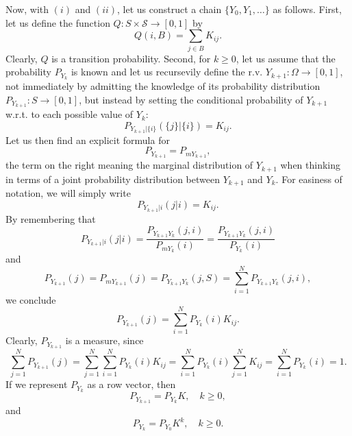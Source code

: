 Now, with $(i)$ and $(ii)$, let us construct a chain $\{Y_0,Y_1,\ldots\}$ as follows.
First, let us define the function $Q:S\times\mathcal{S}\rightarrow [0,1]$ by
\begin{equation*}
Q(i,B) = \sum_{j\in B}{K}_{ij}.
\end{equation*}
Clearly, $Q$ is a transition probability.
Second, for $k\geqslant 0$, let us assume that the probability $P_{Y_{k}}$ is known and
let us recursevily define the r.v. $Y_{k+1}:\Omega\rightarrow [0,1]$,
not immediately
by admitting the knowledge of its probability distribution $P_{Y_{k+1}}:S\rightarrow [0,1]$,
but instead
by setting the conditional probability of $Y_{k+1}$ w.r.t. to each possible value of $Y_k$:
\begin{equation*}
P_{Y_{k+1}|\{i\}}(\{j\}|\{i\})={K}_{ij}.
\end{equation*}
Let us then find an explicit formula for
\begin{equation*}
P_{Y_{k+1}} = P_{mY_{k+1}},
\end{equation*}
the term on the right meaning the marginal distribution of $Y_{k+1}$ when thinking in terms of a joint probability distribution between $Y_{k+1}$ and $Y_k$.
For easiness of notation, we will simply write
\begin{equation*}
P_{Y_{k+1}|i}(j|i)={K}_{ij}.
\end{equation*}
%
By remembering that
\begin{equation*}
P_{Y_{k+1}|i}(j|i) = \frac{P_{Y_{k+1}Y_k}(j,i)}{P_{mY_k}(i)} = \frac{P_{Y_{k+1}Y_k}(j,i)}{P_{Y_k}(i)}
\end{equation*}
and
\begin{equation*}
P_{Y_{k+1}}(j) = P_{mY_{k+1}}(j) = P_{Y_{k+1}Y_k}(j,S) = \sum_{i=1}^{N}P_{Y_{k+1}Y_k}(j,i),
\end{equation*}
we conclude
\begin{equation*}
P_{Y_{k+1}}(j) = \sum_{i=1}^{N}P_{Y_k}(i){K}_{ij}.
\end{equation*}
Clearly, $P_{Y_{k+1}}$ is a measure, since
\begin{equation*}
\sum_{j=1}^{N}P_{Y_{k+1}}(j) = \sum_{j=1}^{N}\sum_{i=1}^{N}P_{Y_k}(i){K}_{ij} = \sum_{i=1}^{N}P_{Y_k}(i)\sum_{j=1}^{N}{K}_{ij} = \sum_{i=1}^{N}P_{Y_k}(i) = 1.
\end{equation*}
If we represent $P_{Y_k}$ as a row vector, then
\begin{equation}\label{eq-markov-recursive-relation-finite}
P_{Y_{k+1}}  = P_{Y_k}K,\quad k\geqslant 0,
\end{equation}
and
\begin{equation*}
P_{Y_k}  = P_{Y_0}{K}^k,\quad k\geqslant 0.
\end{equation*}

